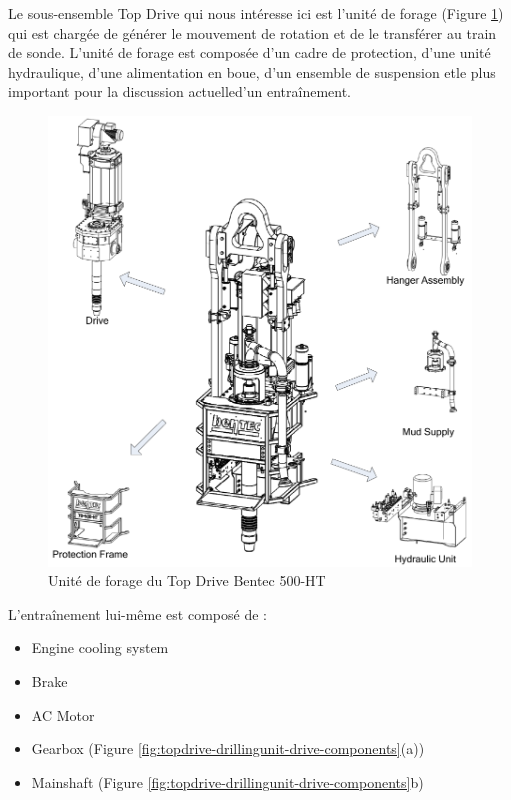 Le sous-ensemble Top Drive qui nous intéresse ici est l'unité de forage (Figure \ref{fig:topdrive-drillingunit}) qui est chargée de générer le mouvement de rotation et de le transférer au train de sonde. L'unité de forage est composée d'un cadre de protection, d'une unité hydraulique, d'une alimentation en boue, d'un ensemble de suspension et\textemdash  le plus important pour la discussion actuelle\textemdash  d'un entraînement.

\begin{figure}[H]
	\centering
	\includegraphics[width=.7\linewidth]{figures/topdrive_drillingunit.png}
	\caption{Unité de forage du Top Drive Bentec 500-HT}%
	\label{fig:topdrive-drillingunit}
\end{figure}

L'entraînement lui-même est composé de :

\begin{itemize}
	\item Engine cooling system
	\item Brake
	\item AC Motor
	\item Gearbox (Figure \ref{fig:topdrive-drillingunit-drive-components}(a))
	\item Mainshaft (Figure \ref{fig:topdrive-drillingunit-drive-components}b)
\end{itemize}

